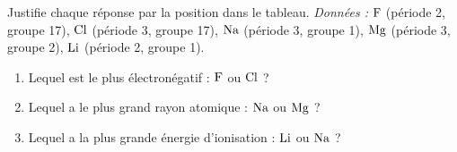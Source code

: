 \documentclass[11pt,a4paper]{article}
\begin{document}
\begin{exo}
Justifie chaque réponse par la position dans le tableau. \textit{Données :} $\ce{F}$ (période 2,
groupe 17), $\ce{Cl}$ (période 3, groupe 17), $\ce{Na}$ (période 3, groupe 1), $\ce{Mg}$ (période 3,
groupe 2), $\ce{Li}$ (période 2, groupe 1).
\begin{enumerate}[label=\alph*)]
  \item Lequel est le plus électronégatif : $\ce{F}$ ou $\ce{Cl}$ ?
  \item Lequel a le plus grand rayon atomique : $\ce{Na}$ ou $\ce{Mg}$ ?
  \item Lequel a la plus grande énergie d'ionisation : $\ce{Li}$ ou $\ce{Na}$ ?
\end{enumerate}
\end{exo}
\end{document}
